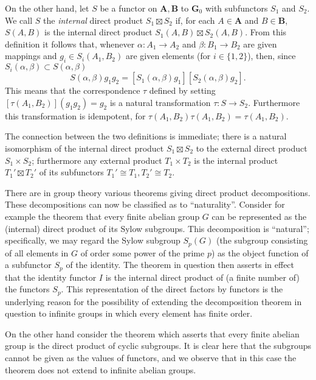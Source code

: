 \documentclass[11pt,a4paper]{report}
\begin{document}
On the other hand, let $S$ be a functor on $\mathbf{A,B}$ to $\mathbf{G}_0$ with subfunctors $S_1$ and $S_2$. We call $S$ the
\emph{internal} direct product $S_1\boxtimes S_2$ if, for each $A\in\mathbf{A}$ and $B\in\mathbf{B}$, $S(A,B)$ is the internal
direct product $S_1(A,B)\boxtimes S_2(A,B)$. From this definition it follows that, whenever $\alpha:A_1\rightarrow A_2$ and
$\beta:B_1\rightarrow B_2$ are given mappings and $g_i\in S_i(A_1,B_2)$ are given elements (for $i\in\{1,2\}$), then, since
$S_i(\alpha,\beta)\subset S(\alpha,\beta)$
\begin{equation*}
	S(\alpha,\beta)g_1 g_2 = [S_1(\alpha,\beta)g_1][S_2(\alpha,\beta)g_2].
\end{equation*}
This means that the correspondence $\tau$ defined by setting $[\tau(A_1,B_2)](g_1 g_2)= g_2$ is a natural transformation 
$\tau:S\rightarrow S_2$. Furthermore this transformation is idempotent, for $\tau(A_1,B_2)\tau(A_1,B_2)=\tau(A_1,B_2)$.

The connection between the two definitions is immediate; there is a natural isomorphism of the internal direct product
$S_1\boxtimes S_2$ to the external direct product $S_1\times S_2$; furthermore any external product $T_1\times T_2$ is the
internal product $T_1'\boxtimes T_2'$ of its subfunctors $T_1'\cong T_1, T_2'\cong T_2$.

There are in group theory various theorems giving direct product decompositions. These decompositions can now be classified
as to ``naturality''. Consider for example the theorem that every finite abelian group $G$ can be represented as the 
(internal) direct product of its Sylow subgroups. This decomposition is ``natural''; specifically, we may regard the Sylow
subgroup $S_p(G)$ (the subgroup consisting of all elements in $G$ of order some power of the prime $p$) as the object function
of a subfunctor $S_p$ of the identity. The theorem in question then asserts in effect that the identity functor $I$ is the
internal direct product of (a finite number of) the functors $S_p$. This representation of the direct factors by functors
is the underlying reason for the possibility of extending the decomposition theorem in question to infinite groups in which
every element has finite order.

On the other hand consider the theorem which asserts that every finite abelian group is the direct product of cyclic
subgroups. It is clear here that the subgroups cannot be given as the values of functors, and we observe that in this
case the theorem does not extend to infinite abelian groups.
\end{document}
